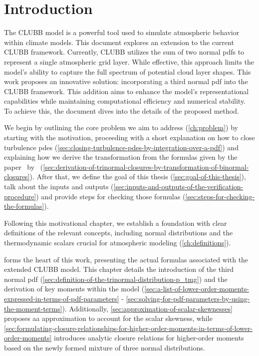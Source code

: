 \chapter{Introduction}\label{ch:introduction}

The \gls{CLUBB} model is a powerful tool used to simulate atmospheric behavior within climate models.
This document explores an extension to the current \gls{CLUBB} framework.
Currently, \gls{CLUBB} utilizes the sum of two normal \glspl{pdf}
to represent a single atmospheric grid layer.
While effective,
this approach limits the model's ability to capture the full spectrum of potential cloud layer shapes.
This work proposes an innovative solution:
incorporating a third normal \gls{pdf} into the \gls{CLUBB} framework.
This addition aims to enhance the model's representational capabilities
while maintaining computational efficiency and numerical stability.
To achieve this, the document dives into the details of the proposed method.

We begin by outlining the core problem we aim to address (\cref{ch:problem})
by starting with the motivation,
proceeding with a short explanation on how to close turbulence \glspl{pde}
(\cref{sec:closing-turbulence-pdes-by-integration-over-a-pdf})
and explaining how we derive the transformation from the formulas
given by the paper~ by~\citeauthor{larson2005using}
(\cref{sec:derivation-of-trinormal-closures-by-transformation-of-binormal-closures}).
After that, we define the goal of this thesis (\cref{sec:goal-of-this-thesis}),
talk about the inputs and outputs (\cref{sec:inputs-and-outputs-of-the-verification-procedure})
and provide steps for checking those formulas (\cref{sec:steps-for-checking-the-formulas}).

Following this motivational chapter,
we establish a foundation with clear definitions of the relevant concepts,
including normal distributions and the thermodynamic scalars
crucial for atmospheric modeling (\cref{ch:definitions}).

 forms the heart of this work,
presenting the actual formulas associated with the extended \gls{CLUBB} model.
This chapter details the introduction of the third normal \gls{pdf} (\cref{sec:definition-of-the-trinormal-distribution-p_tmg})
and the derivation of key moments within the model
(\cref{sec:a-list-of-lower-order-moments-expressed-in-terms-of-pdf-parameters} -
\cref{sec:solving-for-pdf-parameters-by-using-the-moment-terms}).
Additionally,
\cref{sec:approximation-of-scalar-skewnesses} proposes aa approximation
to account for the scalar skewness,
while \cref{sec:formulating-closure-relationships-for-higher-order-moments-in-terms-of-lower-order-moments}
introduces analytic closure relations
for higher-order moments based on the newly formed mixture of three normal distributions.

